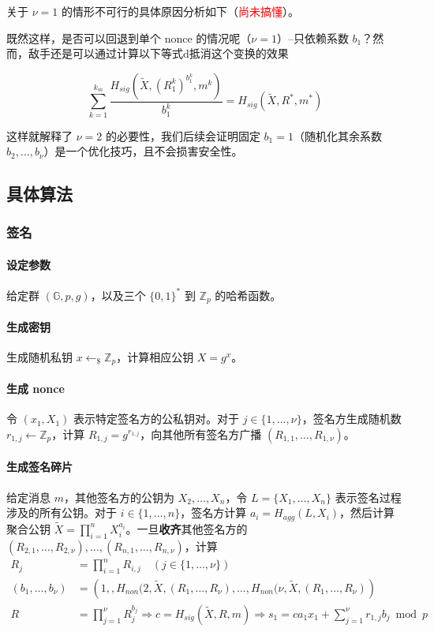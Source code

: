 \documentclass[a4paper,10pt]{article}
\newcommand{\bG}{\mathbb{G}}
\newcommand{\bZ}{\mathbb{Z}}
\begin{document}
关于 \(\nu=1\) 的情形不可行的具体原因分析如下（\textcolor{red}{尚未搞懂}）。

既然这样，是否可以回退到单个 nonce 的情况呢（\(\nu=1\)）--只依赖系数 \(b_1\)？然而，敌手还是可以通过计算以下等式d抵消这个变换的效果

\[
  \sum_{k=1}^{k_m} \frac{H_{sig}(\tilde{X},(R_1^k)^{b_1^k},m^k)}{b_1^k} = H_{sig}(\tilde{X},R^*,m^*)  
\]

这样就解释了 \(\nu=2\) 的必要性，我们后续会证明固定 \(b_1=1\)（随机化其余系数 \(b_2,\dots,b_{\nu}\)）是一个优化技巧，且不会损害安全性。

\subsection{具体算法}
\subsubsection{签名}
\paragraph{设定参数} 给定群 \((\bG,p,g)\)，以及三个 \(\{0,1\}^*\) 到 \(\bZ_p\) 的哈希函数。
\paragraph{生成密钥} 生成随机私钥 \(x\leftarrow_{\$} \bZ_p\)，计算相应公钥 \(X=g^x\)。
\paragraph{生成 nonce} 令 \((x_1,X_1)\) 表示特定签名方的公私钥对。对于 \(j\in\{1,\dots,\nu\}\)，签名方生成随机数 \(r_{1,j}\leftarrow \bZ_p\)，计算 \(R_{1,j}=g^{r_{1,j}}\)，向其他所有签名方广播 \((R_{1,1},\dots,R_{1,\nu})\)。
\paragraph{生成签名碎片} 给定消息 \(m\)，其他签名方的公钥为 \(X_2,\dots,X_n\)，令 \(L=\{X_1,\dots,X_n\}\) 表示签名过程涉及的所有公钥。对于 \(i\in\{1,\dots,n\}\)，签名方计算 \(a_i=H_{agg}(L,X_i)\)，然后计算聚合公钥 \(\tilde{X}=\prod_{i=1}^n X_i^{a_i}\)。一旦\textbf{收齐}其他签名方的 \((R_{2,1},\dots,R_{2,\nu}),\dots,(R_{n,1},\dots,R_{n,\nu})\)，计算 
\begin{align*}
  R_j &= \prod_{i=1}^n R_{i,j}\quad (j\in\{1,\dots,\nu\}) \\
  (b_1,\dots,b_{\nu}) &=\left(1,,H_{non}(2,\tilde{X},(R_1,\dots,R_{\nu}),\dots,H_{non}(\nu,\tilde{X},(R_1,\dots,R_{\nu})\right) \\
  R &= \prod_{j=1}^{\nu} R_j^{b_j} \Rightarrow c = H_{sig}(\tilde{X},R,m) \Rightarrow s_1 = ca_1x_1+\sum_{j=1}^{\nu}r_{1,j}b_j\bmod p
\end{align*}
\end{document}
